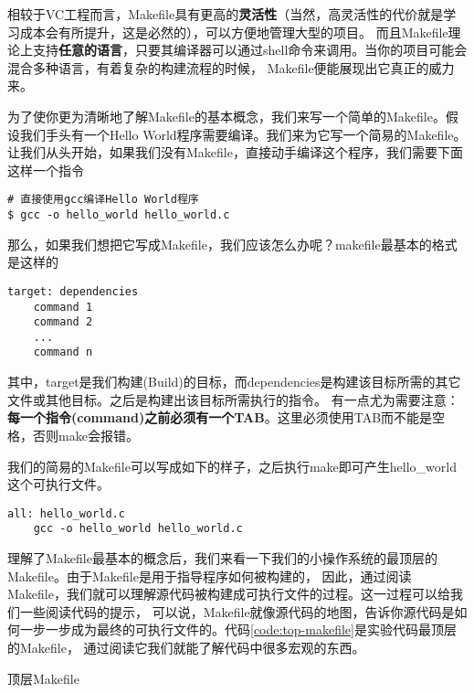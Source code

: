 \begin{note}
相较于VC工程而言，Makefile具有更高的\textbf{灵活性}（当然，高灵活性的代价就是学习成本会有所提升，这是必然的），可以方便地管理大型的项目。
而且Makefile理论上支持\textbf{任意的语言}，只要其编译器可以通过shell命令来调用。当你的项目可能会混合多种语言，有着复杂的构建流程的时候，
Makefile便能展现出它真正的威力来。
\end{note}

为了使你更为清晰地了解Makefile的基本概念，我们来写一个简单的Makefile。假设我们手头有一个Hello World程序需要编译。我们来为它写一个简易的Makefile。
让我们从头开始，如果我们没有Makefile，直接动手编译这个程序，我们需要下面这样一个指令

\begin{verbatim}
# 直接使用gcc编译Hello World程序
$ gcc -o hello_world hello_world.c
\end{verbatim}

那么，如果我们想把它写成Makefile，我们应该怎么办呢？makefile最基本的格式是这样的

\begin{verbatim}
target: dependencies
    command 1
    command 2
    ...
    command n
\end{verbatim}

其中，target是我们构建(Build)的目标，而dependencies是构建该目标所需的其它文件或其他目标。之后是构建出该目标所需执行的指令。
有一点尤为需要注意：\textbf{每一个指令(command)之前必须有一个TAB}。这里必须使用TAB而不能是空格，否则make会报错。

我们的简易的Makefile可以写成如下的样子，之后执行make即可产生hello\_world这个可执行文件。

\begin{verbatim}
all: hello_world.c
    gcc -o hello_world hello_world.c
\end{verbatim}

理解了Makefile最基本的概念后，我们来看一下我们的小操作系统的最顶层的Makefile。由于Makefile是用于指导程序如何被构建的，
因此，通过阅读Makefile，我们就可以理解源代码被构建成可执行文件的过程。这一过程可以给我们一些阅读代码的提示，
可以说，Makefile就像源代码的地图，告诉你源代码是如何一步一步成为最终的可执行文件的。代码\ref{code:top-makefile}是实验代码最顶层的Makefile，
通过阅读它我们就能了解代码中很多宏观的东西。

\begin{codeBoxWithCaption}{顶层Makefile\label{code:top-makefile}}
  \inputminted[linenos]{make}{codes/top-Makefile}
\end{codeBoxWithCaption}

